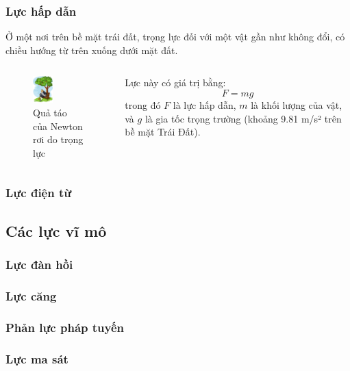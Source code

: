\begin{frame}
    \frametitle{Lực hấp dẫn}
    Ở một nơi trên bề mặt trái đất, trọng lực đối với một vật gần như không đổi, có chiều hướng từ trên xuống dưới mặt đất.
    \begin{columns}
    \begin{column}{0.5\textwidth}
        \begin{figure}
        \centering
        \includegraphics[width=0.4\textwidth]{Slides/Figure/applefalling.jpg}
        \caption{Quả táo của Newton rơi do trọng lực}
        \end{figure}
    \end{column}
    \begin{column}{0.5\textwidth}
        Lực này có giá trị bằng:
        \begin{equation}
            F=mg
        \end{equation}
        trong đó \(F\) là lực hấp dẫn, \(m\) là khối lượng của vật, và \(g\) là gia tốc trọng trường (khoảng 9.81 m/s² trên bề mặt Trái Đất).
    \end{column}
    \end{columns}
\end{frame}

\begin{frame}
\frametitle{Lực điện từ}
\end{frame}
\subsection{Các lực vĩ mô}
\begin{frame}
    \frametitle{Lực đàn hồi}
\end{frame}
\begin{frame}
    \frametitle{Lực căng}
\end{frame}
\begin{frame}
    \frametitle{Phản lực pháp tuyến}
\end{frame}
\begin{frame}
    \frametitle{Lực ma sát}
\end{frame}